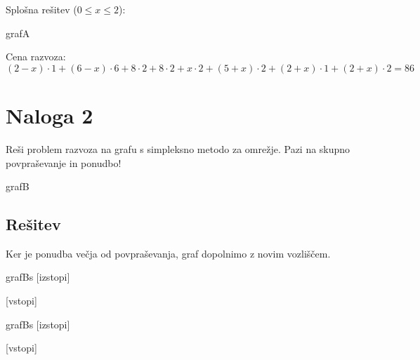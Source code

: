 \documentclass[14pt]{extarticle}
\begin{document}
Splošna rešitev ($0 \le x \le 2$):

\begin{razvoz}{grafA}

\end{razvoz}

Cena razvoza: $(2-x) \cdot 1 + (6-x) \cdot 6 + 8 \cdot 2 + 8 \cdot 2 + x \cdot 2 + (5+x) \cdot 2 + (2+x) \cdot 1 + (2+x) \cdot 2 = 86$

\clearpage
\section*{Naloga 2}

Reši problem razvoza na grafu s simpleksno metodo za omrežje.
Pazi na skupno povpraševanje in ponudbo!

\begin{razvoz}{grafB}
\end{razvoz}

\subsection*{Rešitev}

Ker je ponudba večja od povpraševanja,
graf dopolnimo z novim vozliščem.

\begin{razvoz}{grafBs}
    [izstopi]


    [vstopi]
\end{razvoz}

\begin{razvoz}{grafBs}
    [izstopi]


    [vstopi]
\end{razvoz}
\end{document}
